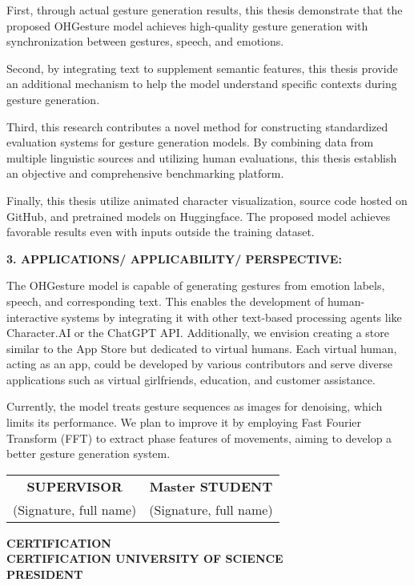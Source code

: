 First, through actual gesture generation results, this thesis demonstrate that the proposed OHGesture model achieves high-quality gesture generation with synchronization between gestures, speech, and emotions.

Second, by integrating text to supplement semantic features, this thesis provide an additional mechanism to help the model understand specific contexts during gesture generation.

Third, this research contributes a novel method for constructing standardized evaluation systems for gesture generation models. By combining data from multiple linguistic sources and utilizing human evaluations, this thesis establish an objective and comprehensive benchmarking platform.

Finally, this thesis utilize animated character visualization, source code hosted on GitHub, and pretrained models on Huggingface. The proposed model achieves favorable results even with inputs outside the training dataset.

\vspace{5pt}
{\MakeUppercase\Large \bfseries 3. APPLICATIONS/ APPLICABILITY/ PERSPECTIVE:}

The OHGesture model is capable of generating gestures from emotion labels, speech, and corresponding text. This enables the development of human-interactive systems by integrating it with other text-based processing agents like Character.AI or the ChatGPT API. Additionally, we envision creating a store similar to the App Store but dedicated to virtual humans. Each virtual human, acting as an app, could be developed by various contributors and serve diverse applications such as virtual girlfriends, education, and customer assistance.

Currently, the model treats gesture sequences as images for denoising, which limits its performance. We plan to improve it by employing Fast Fourier Transform (FFT) to extract phase features of movements, aiming to develop a better gesture generation system.

\begin{center}
    \begin{tabular}{c c}
        \textbf{SUPERVISOR} & \textbf{Master STUDENT} \\
        (Signature, full name) & (Signature, full name) \\
    \end{tabular}
    
    \vspace{2.5cm} %
    
    \textbf{CERTIFICATION} \\
    \textbf{CERTIFICATION UNIVERSITY OF SCIENCE} \\
    \textbf{PRESIDENT}
\end{center}

\pagebreak